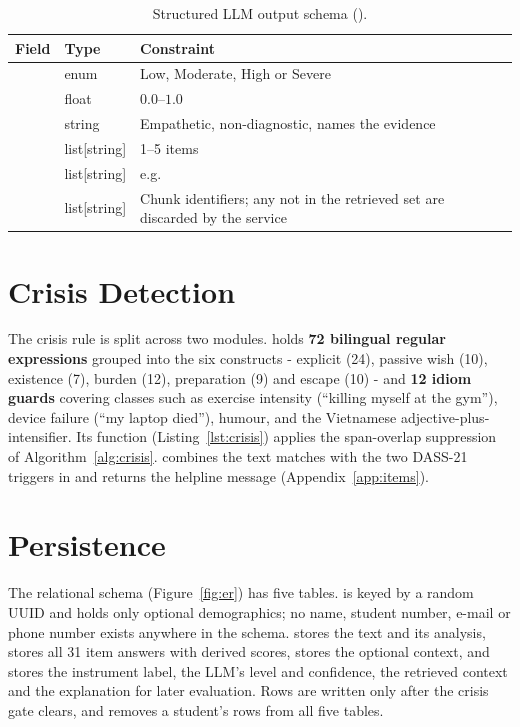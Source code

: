 \begin{table}[ht]
	\centering
	\caption{Structured LLM output schema ().}
	\label{tab:schema}
	\begin{tabularx}{\textwidth}{llL}
		\toprule
		Field                    & Type         & Constraint \\ \midrule
		  & enum         & Low, Moderate, High or Severe \\
		        & float        & $0.0$--$1.0$ \\
		         & string       & Empathetic, non-diagnostic, names the evidence \\
		       & list[string] & 1--5 items \\
		       & list[string] & e.g.  \\
		         & list[string] & Chunk identifiers; any not in the retrieved set are discarded by the service \\ \bottomrule
	\end{tabularx}
\end{table}

\section{Crisis Detection}
The crisis rule is split across two modules.  holds \textbf{72 bilingual regular expressions} grouped into the six constructs - explicit (24), passive wish (10), existence (7), burden (12), preparation (9) and escape (10) - and \textbf{12 idiom guards} covering classes such as exercise intensity (``killing myself at the gym''), device failure (``my laptop died''), humour, and the Vietnamese adjective-plus- intensifier. Its  function (Listing~\ref{lst:crisis}) applies the span-overlap suppression of Algorithm~\ref{alg:crisis}.  combines the text matches with the two DASS-21 triggers in  and returns the helpline message (Appendix~\ref{app:items}).

\section{Persistence}
The relational schema (Figure~\ref{fig:er}) has five tables.  is keyed by a random UUID and holds only optional demographics; no name, student number, e-mail or phone number exists anywhere in the schema.  stores the text and its analysis,  stores all 31 item answers with derived scores,  stores the optional context, and  stores the instrument label, the LLM's level and confidence, the retrieved context and the explanation for later evaluation. Rows are written only after the crisis gate clears, and  removes a student's rows from all five tables.

